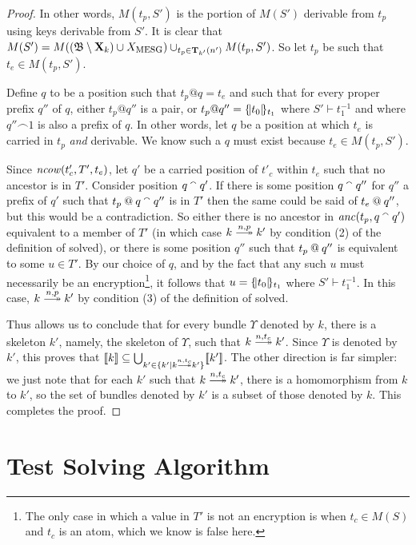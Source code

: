 \documentclass[12pt]{article}
\theoremstyle{definition}
\newcommand{\scap}[1]{\ensuremath{\mathop{\relax
                    \smash{\mbox{\sc#1}}}\!\mathop{\vphantom{#1}}\nolimits}}
\newcommand{\base}{\ensuremath{\mathfrak B}}
\newcommand{\solve}[1]{\stackrel{#1}{\longtwoheadrightarrow}}
\newcommand{\excl}{\mathbf{X}}
\newcommand{\transpred}{\mathbf{T}}
\newcommand{\anc}{\fn{anc}}
\newcommand{\mncow}{\fn{ncow}}
\begin{document}
\begin{proof}
In other words, $M(t_p,S')$ is the portion of $M(S')$ derivable from $t_p$ using keys derivable from $S'$.  It is clear that
$M(S') = M((\base\setminus\excl_k)\cup X_{\scap{mesg}}) \cup_{t_p \in \transpred_{k'}(n')} M(t_p,S')$.  So let $t_p$ be such that $t_e
\in M(t_p,S')$.

Define $q$ to be a position such that $t_p @ q = t_e$ and such that for every proper prefix $q''$ of $q$, either $t_p @ q''$
is a pair, or $t_p @ q'' = \{\!|t_0|\!\}_{t_1}$ where $S' \vdash t_1^{-1}$ and where $q'' \frown 1$ is also a prefix of $q$.
In other words, let $q$ be a position at which $t_e$ is carried in $t_p$ {\em and} derivable.  We know such a $q$ must exist
because $t_e \in M(t_p,S')$.

Since $\mncow(t'_c, T', t_e)$, let $q'$ be a carried position of $t'_c$ within $t_e$ such that no ancestor is in $T'$.  Consider
position $q \mathbin{{}^\smallfrown} q'$.  If there is some position $q \mathbin{{}^\smallfrown} q''$ for $q''$ a prefix of $q'$ such that $t_p \mathbin{@} q \mathbin{{}^\smallfrown}
q''$ is in $T'$ then the same could be said of $t_e \mathbin{@} q''$, but this would be a contradiction.  So either there is
no ancestor in $\anc(t_p, q \append q')$ equivalent to a member of $T'$ (in which case $k\solve{n,p}k'$ by condition (2)
of the definition of solved), or there is some position $q''$ such that $t_p \mathbin{@} q''$ is equivalent to some $u \in T'$.
By our choice of $q$, and by the fact that any such $u$ must necessarily be an encryption\footnote{The only case in which a
value in $T'$ is not an encryption is when $t_c \in M(S)$ and $t_c$ is an atom, which we know is false here.}, it follows that
$u = \{\!|t_0|\!\}_{t_1}$ where $S' \vdash t_1^{-1}$.  In this case, $k\solve{n,p}k'$ by condition (3) of the definition of solved.

Thus allows us to conclude that for every bundle $\Upsilon$ denoted by $k$, there is a skeleton $k'$,
namely, the skeleton of $\Upsilon$, such that $k\solve{n,t_c}k'$.  Since $\Upsilon$ is denoted by $k'$,
this proves that $\sembrack{k} \subseteq \bigcup_{k'\in\{k'\mid k\solve{n,t_c}k'\}}\sembrack{k'}$.  The other direction
is far simpler: we just note that for each $k'$ such that $k\solve{n,t_c}k'$, there is a homomorphism
from $k$ to $k'$, so the set of bundles denoted by $k'$ is a subset of those denoted by $k$.  This completes the proof.

\end{proof}

\section{Test Solving Algorithm}
\end{document}
